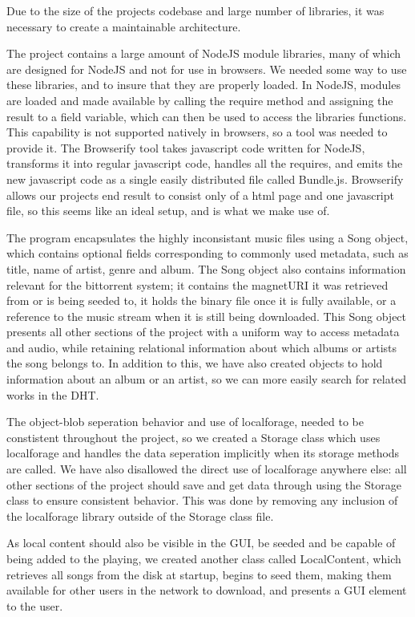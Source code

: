 Due to the size of the projects codebase and large number of libraries, it was necessary to create a maintainable architecture.

The project contains a large amount of NodeJS module libraries, 
many of which are designed for NodeJS and not for use in browsers.
We needed some way to use these libraries, and to insure that they are properly loaded.
In NodeJS, modules are loaded and made available by calling the require method 
and assigning the result to a field variable, which can then be used to access the libraries functions.
This capability is not supported natively in browsers, so a tool was needed to provide it.
The Browserify tool takes javascript code written for NodeJS, 
transforms it into regular javascript code, 
handles all the requires, 
and emits the new javascript code as a single easily distributed file called Bundle.js.
Browserify allows our projects end result to consist only of a html page and one javascript file, 
so this seems like an ideal setup, and is what we make use of.

The program encapsulates the highly inconsistant music files using a Song object,
which contains optional fields corresponding to commonly used metadata, 
such as title, name of artist, genre and album. 
The Song object also contains information relevant for the bittorrent system; 
it contains the magnetURI it was retrieved from or is being seeded to, 
it holds the binary file once it is fully available, 
or a reference to the music stream when it is still being downloaded.
This Song object presents all other sections of the project with a uniform way to access metadata and audio, 
while retaining relational information about which albums or artists the song belongs to. In addition to this, 
we have also created objects to hold information about an album or an artist, 
so we can more easily search for related works in the DHT.




The object-blob seperation behavior and use of localforage,
needed to be constistent throughout the project, 
so we created a Storage class which uses localforage and handles the data seperation implicitly when its storage methods are called.
We have also disallowed the direct use of localforage anywhere else: all other sections of the project should save and get data through using the Storage class to ensure consistent behavior. 
This was done by removing any inclusion of the localforage library outside of the Storage class file.

As local content should also be visible in the GUI, 
be seeded and be capable of being added to the playing,
we created another class called LocalContent,
which retrieves all songs from the disk at startup,
begins to seed them, making them available for other users in the network to download,
and presents a GUI element to the user.


